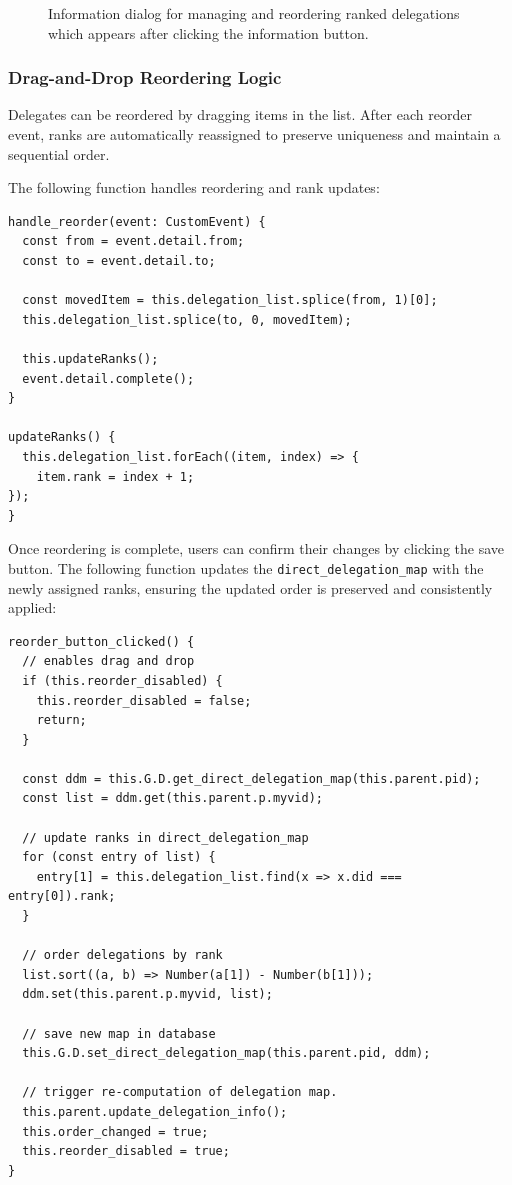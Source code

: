 \begin{figure}[H]
  \caption{Information dialog for managing and reordering ranked delegations which appears after clicking the information button.}
\end{figure}

\subsubsection{Drag-and-Drop Reordering Logic}

Delegates can be reordered by dragging items in the list. After each reorder event, ranks are automatically reassigned to preserve uniqueness and maintain a sequential order.

The following  function handles reordering and rank updates:

\begin{verbatim}
handle_reorder(event: CustomEvent) {
  const from = event.detail.from;
  const to = event.detail.to;

  const movedItem = this.delegation_list.splice(from, 1)[0];
  this.delegation_list.splice(to, 0, movedItem);

  this.updateRanks();
  event.detail.complete();
}

updateRanks() {
  this.delegation_list.forEach((item, index) => {
    item.rank = index + 1;
});
}
\end{verbatim}

Once reordering is complete, users can confirm their changes by clicking the save button. The following function updates the \texttt{direct\_delegation\_map} with the newly assigned ranks, ensuring the updated order is preserved and consistently applied:

\begin{verbatim}
reorder_button_clicked() {
  // enables drag and drop
  if (this.reorder_disabled) {
    this.reorder_disabled = false;
    return;
  }

  const ddm = this.G.D.get_direct_delegation_map(this.parent.pid);
  const list = ddm.get(this.parent.p.myvid);

  // update ranks in direct_delegation_map
  for (const entry of list) {
    entry[1] = this.delegation_list.find(x => x.did === entry[0]).rank;
  }

  // order delegations by rank
  list.sort((a, b) => Number(a[1]) - Number(b[1]));
  ddm.set(this.parent.p.myvid, list);

  // save new map in database
  this.G.D.set_direct_delegation_map(this.parent.pid, ddm);

  // trigger re-computation of delegation map.
  this.parent.update_delegation_info();
  this.order_changed = true;
  this.reorder_disabled = true;
}
\end{verbatim}

